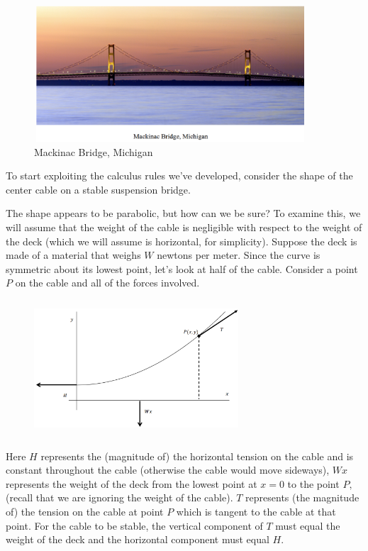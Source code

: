 \begin{figure}
\captionsetup{labelformat=empty}
\centerline{\includegraphics*[height=2in,width=4in]{Figures/MackinacBridge1}}
\caption{Mackinac Bridge, Michigan}
\label{fig:}
\end{figure}
To start exploiting the calculus rules we've developed, consider the
shape of the center cable on a stable suspension bridge.

The shape appears to be parabolic, but how can we be sure?  To examine
this, we will assume that the weight of the cable is negligible with
respect to the weight of the deck (which we will assume is horizontal,
for simplicity).  Suppose the deck is made of a material that weighs $W$
newtons per meter.  Since the curve is symmetric about its lowest
point, let's look at half of the cable.  Consider a point $P$ on the
cable and all of the forces involved. 
\begin{figure}
\captionsetup{labelformat=empty}
\centerline{\includegraphics*[height=2in,width=3in]{Figures/MackinacBridge2}}
\label{fig:}
\end{figure}

Here $H$ represents the (magnitude of) the horizontal tension on the
cable and is constant throughout the cable (otherwise the cable would
move sideways), $Wx$ represents the weight of the deck from the lowest
point at $x=0$ to the point $P,$ (recall that we are ignoring the weight
of the cable).  $T$ represents (the magnitude of) the tension on the
cable at point $P$ which is tangent to the cable at that point.  For the
cable to be stable, the vertical component of $T$ must equal the weight
of the deck and the horizontal component must equal $H.$

